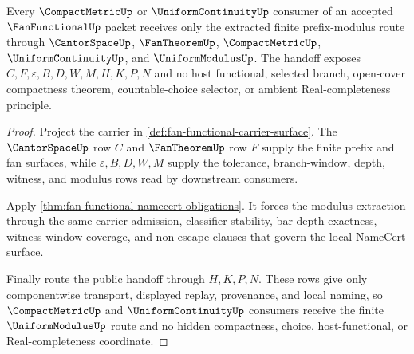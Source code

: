 \begin{theorem}
\label{thm:fan-functional-uniform-modulus-consumer-boundary}
Every $\CompactMetricUp$ or $\UniformContinuityUp$ consumer of an accepted $\FanFunctionalUp$ packet receives only the extracted finite prefix-modulus route through $\CantorSpaceUp$, $\FanTheoremUp$, $\CompactMetricUp$, $\UniformContinuityUp$, and $\UniformModulusUp$. The handoff exposes $C,F,\varepsilon,B,D,W,M,H,K,P,N$ and no host functional, selected branch, open-cover compactness theorem, countable-choice selector, or ambient Real-completeness principle.
\end{theorem}
\begin{proof}
Project the carrier in \autoref{def:fan-functional-carrier-surface}. The $\CantorSpaceUp$ row $C$ and $\FanTheoremUp$ row $F$ supply the finite prefix and fan surfaces, while $\varepsilon,B,D,W,M$ supply the tolerance, branch-window, depth, witness, and modulus rows read by downstream consumers.

Apply \autoref{thm:fan-functional-namecert-obligations}. It forces the modulus extraction through the same carrier admission, classifier stability, bar-depth exactness, witness-window coverage, and non-escape clauses that govern the local NameCert surface.

Finally route the public handoff through $H,K,P,N$. These rows give only componentwise transport, displayed replay, provenance, and local naming, so $\CompactMetricUp$ and $\UniformContinuityUp$ consumers receive the finite $\UniformModulusUp$ route and no hidden compactness, choice, host-functional, or Real-completeness coordinate.
\end{proof}

